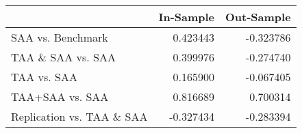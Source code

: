 \begin{tabular}{lrr}
\toprule
{} &  In-Sample &  Out-Sample \\
\midrule
SAA vs. Benchmark         &   0.423443 &   -0.323786 \\
TAA \& SAA vs. SAA         &   0.399976 &   -0.274740 \\
TAA vs. SAA               &   0.165900 &   -0.067405 \\
TAA+SAA vs. SAA           &   0.816689 &    0.700314 \\
Replication vs. TAA \& SAA &  -0.327434 &   -0.283394 \\
\bottomrule
\end{tabular}
